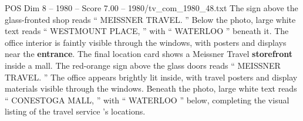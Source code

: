 \begin{textsample}{POS Dim 8 – 1980 – Score 7.00 – 1980/tv\_com\_1980\_48.txt}
The sign above the glass-fronted shop reads “ MEISSNER TRAVEL. ” Below the photo, large white text reads “ WESTMOUNT PLACE, ” with “ WATERLOO ” beneath it.
The office interior is faintly visible through the windows, with posters and displays near the \textbf{entrance}.
The final location card shows a Meissner Travel \textbf{storefront} inside a mall.
The red-orange sign above the glass doors reads “ MEISSNER TRAVEL. ” The office appears brightly lit inside, with travel posters and display materials visible through the windows.
Beneath the photo, large white text reads “ CONESTOGA MALL, ” with “ WATERLOO ” below, completing the visual listing of the travel service ’s locations.

\end{textsample}
